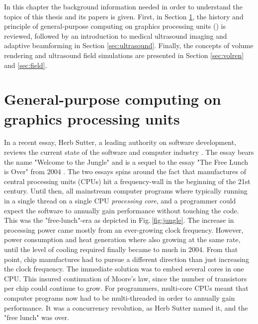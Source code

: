 %

In this chapter the background information needed in order to understand the topics of this thesis and its papers is given. First, in Section \ref{sec:gpgpu}, the history and principle of general-purpose computing on graphics processing units () is reviewed, followed by an introduction to medical ultrasound imaging and adaptive beamforming in Section \ref{sec:ultrasound}. Finally, the concepts of volume rendering and ultrasound field simulations are presented in Section \ref{sec:volren} and \ref{sec:field}.

\section{General-purpose computing on graphics processing units}\label{sec:gpgpu}
In a recent essay, Herb Sutter, a leading authority on software development, reviews the current state of the software and computer industry \cite{HerbSutter}. The essay bears the name "Welcome to the Jungle" and is a sequel to the essay "The Free Lunch is Over" from 2004 \cite{HerbSuttera}. The two essays spins around the fact that manufactures of central processing units (CPUs) hit a frequency-wall in the beginning of the 21st century. Until then, all mainstream computer programs where typically running in a single thread on a single CPU \textit{processing core}, and a programmer could expect the software to annually gain performance without touching the code. This was the "free-lunch"-era as depicted in Fig.\,\ref{fig:jungle}. The increase in processing power came mostly from an ever-growing clock frequency. However, power consumption and heat generation where also growing at the same rate, until the level of cooling required finally became to much in 2004.  From that point, chip manufactures had to pursue a different direction  than just increasing the clock frequency. The immediate solution was to embed several cores in one CPU. This insured continuation of Moore's law, since the number of transistors per chip could continue to grow. For programmers, multi-core CPUs meant that computer programs now had to be multi-threaded in order to annually gain performance. It was a concurrency revolution, as Herb Sutter named it, and  the "free lunch" was over.

